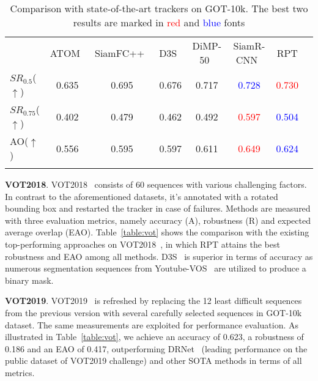 \documentclass[runningheads]{llncs}
\begin{document}
\begin{table}
\begin{center}
\caption{Comparison with state-of-the-art trackers on GOT-10k. The best two results are marked in \textcolor{red}{red} and \textcolor{blue}{blue} fonts}
\label{table:got-10k}
\begin{tabular}{@{}lccccccc@{}}
\hline\noalign{\smallskip}
& ATOM~\cite{atom} & SiamFC++~\cite{siamfc++}  &D3S~\cite{D3S}& DiMP-50~\cite{dimp} & SiamR-CNN~\cite{siamrcnn} & RPT &\tabularnewline
\noalign{\smallskip}
\hline
$SR_{0.5}$($\uparrow$)& 0.635 & 0.695 & 0.676 &0.717& \textcolor{blue}{0.728} &\textcolor{red}{0.730} &\tabularnewline
$SR_{0.75}$($\uparrow$)& 0.402 & 0.479 & 0.462 &0.492& \textcolor{red}{0.597}& \textcolor{blue}{0.504}&\tabularnewline
AO($\uparrow$)& 0.556 & 0.595 & 0.597&0.611& \textcolor{red}{0.649} & \textcolor{blue}{0.624}&\tabularnewline
\hline\noalign{\smallskip}
\end{tabular}

\end{center}
\end{table}

\textbf{VOT2018}. VOT2018~\cite{VOT2018} consists of 60 sequences with various
challenging factors. In contrast to the aforementioned datasets, it's
annotated with a rotated bounding box and restarted the tracker in case
of failures. Methods are measured with three evaluation metrics, namely
accuracy (A), robustness (R) and expected average overlap (EAO). Table~\ref{table:vot}
shows the comparison with the existing top-performing approaches on
VOT2018~\cite{VOT2018}, in which RPT attains the best robustness and EAO among all
methods. D3S~\cite{D3S} is superior in terms of accuracy as numerous segmentation
sequences from Youtube-VOS~\cite{youtubevos} are utilized to produce a binary mask.

\textbf{VOT2019}. VOT2019~\cite{VOT2019} is refreshed by replacing the 12 least
difficult sequences from the previous version with several carefully
selected sequences in GOT-10k dataset. The same measurements are
exploited for performance evaluation. As illustrated in Table~\ref{table:vot}, we
achieve an accuracy of 0.623, a robustness of 0.186 and an EAO of 0.417,
outperforming DRNet~\cite{VOT2019} (leading performance on the public dataset of
VOT2019 challenge) and other SOTA methods in terms of all metrics.
\end{document}
